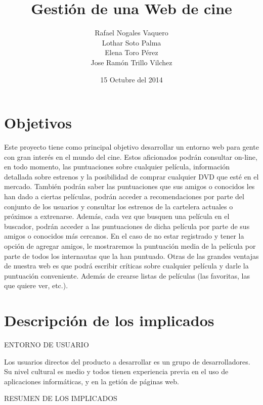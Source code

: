 \documentclass{article}
\title{Gestión de una Web de cine}
\author{Rafael Nogales Vaquero
\\Lothar Soto Palma
\\Elena Toro Pérez
\\Jose Ramón Trillo Vilchez}
\date{15 Octubre del 2014}
\begin{document}
\maketitle

\section{Objetivos}
Este proyecto tiene como principal objetivo desarrollar un entorno web para gente con gran interés en el mundo del cine.
Estos aficionados podrán consultar on-line, en todo momento, las puntuaciones sobre cualquier película, información
detallada sobre estrenos y la posibilidad de comprar cualquier DVD que esté en el mercado.
También podrán saber las puntuaciones que sus amigos o conocidos les han dado a ciertas películas, podrán acceder a
recomendaciones por parte del conjunto de los usuarios y consultar los estrenos de la cartelera actuales o próximos a
extrenarse.
Además, cada vez que busquen una película en el buscador, podrán acceder a las puntuaciones de dicha película por parte de
sus amigos o conocidos más cercanos.
En el caso de no estar registrado y tener la opción de agregar amigos, le mostraremos la puntuación media de la película
por parte de todos los internautas que la han puntuado.
Otras de las grandes ventajas de nuestra web es que podrá escribir críticas sobre cualquier película y darle la puntuación
conveniente. Además de crearse listas de películas (las favoritas, las que quiere ver, etc.).
\section{Descripción de los implicados}
ENTORNO DE USUARIO
\begin{description}
\item Los usuarios directos del producto a desarrollar es un grupo de desarrolladores. Su nivel cultural es medio y todos tienen experiencia previa en el uso de aplicaciones informáticas, y en la getión de páginas web.
\end{description}
\vspace{3cm}
RESUMEN DE LOS IMPLICADOS
\end{document}
